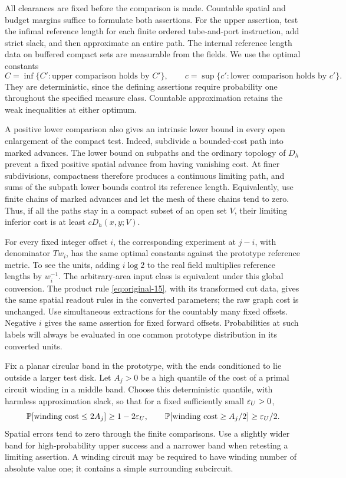 All clearances are fixed before the comparison is made. Countable spatial
and budget margins suffice to formulate both assertions. For the upper
assertion, test the infimal reference length for each finite ordered
tube-and-port instruction, add strict slack, and then approximate an entire
path. The internal reference length data on buffered compact sets are
measurable from the fields. We use the optimal constants
\[
 C=\inf\{C':\text{upper comparison holds by }C'\},\qquad
 c=\sup\{c':\text{lower comparison holds by }c'\}.
\]
They are deterministic, since the defining assertions require probability
one throughout the specified measure class. Countable approximation retains
the weak inequalities at either optimum.

A positive lower comparison also gives an intrinsic lower bound in every
open enlargement of the compact test. Indeed, subdivide a bounded-cost path
into marked advances. The lower bound on subpaths and the ordinary topology
of $D_h$ prevent a fixed positive spatial advance from having vanishing cost.
At finer subdivisions, compactness therefore produces a continuous limiting
path, and sums of the subpath lower bounds control its reference length.
Equivalently, use finite chains of marked advances and let the mesh of these
chains tend to zero. Thus, if all the paths stay in a compact subset of an
open set $V$, their limiting inferior cost is at least $cD_h(x,y;V)$.

For every fixed integer offset $i$, the corresponding experiment at $j-i$,
with denominator $Tw_i$, has the same optimal constants against the prototype
reference metric. To see the units, adding $i\log 2$ to the real field
multiplies reference lengths by $w_i^{-1}$. The arbitrary-area input class is
equivalent under this global conversion. The product rule
\eqref{eq:original-15}, with its transformed cut data, gives the same spatial
readout rules in the converted parameters; the raw graph cost is unchanged.
Use simultaneous extractions for the countably many fixed offsets. Negative
$i$ gives the same assertion for fixed forward offsets. Probabilities at such
labels will always be evaluated in one common prototype distribution in its
converted units.

Fix a planar circular band in the prototype, with the ends conditioned to
lie outside a larger test disk. Let $A_j>0$ be a high quantile of the cost of
a primal circuit winding in a middle band. Choose this deterministic
quantile, with harmless approximation slack, so that for a fixed sufficiently
small $\varepsilon_U>0$,
\begin{equation}\label{metric:quantile-tests}
 \mathbb P[\text{winding cost}\le 2A_j]\ge 1-2\varepsilon_U,
 \qquad
 \mathbb P[\text{winding cost}\ge A_j/2]\ge \varepsilon_U/2.
\end{equation}
Spatial errors tend to zero through the finite comparisons. Use a slightly
wider band for high-probability upper success and a narrower band when
retesting a limiting assertion. A winding circuit may be required to have
winding number of absolute value one; it contains a simple surrounding
subcircuit.

